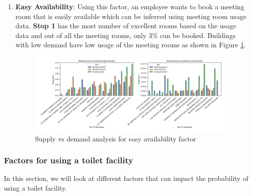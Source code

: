 \begin{enumerate}
    \item \textbf{Easy Availability}: Using this factor, an employee wants to book a meeting room that is easily available which can be inferred using meeting room usage data. \textbf{Stop 1} has the most number of excellent rooms based on the usage data and out of all the meeting rooms, only 3\% can be booked. Buildings with low demand have low usage of the meeting rooms as shown in Figure \ref{usagedata}.
    
\begin{figure}[H]
    \centering
    \includegraphics[width=1\textwidth]{resources/images/snap5.PNG}
    \caption{Supply vs demand analysis for easy availability factor}
    \label{usagedata}
\end{figure}

\end{enumerate}

\subsubsection{Factors for using a toilet facility}

In this section, we will look at different factors that can impact the probability of using a toilet facility.

